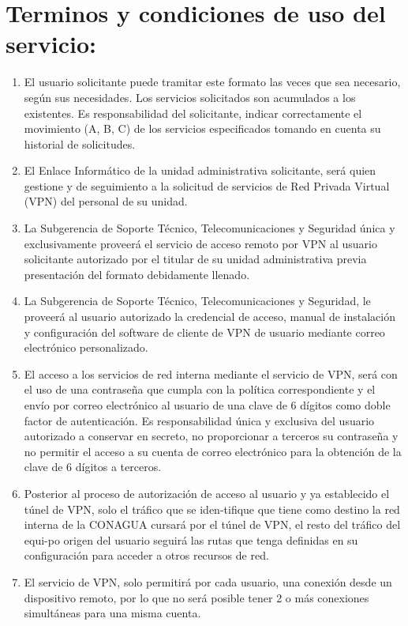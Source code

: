 \documentclass[letterpaper,11pt]{article}
\begin{document}
\section*{Terminos y condiciones de uso del servicio:}
{\footnotesize \begin{enumerate}
	\item El usuario solicitante puede tramitar este formato las veces que sea necesario, según sus necesidades. Los servicios solicitados son acumulados a los existentes. Es responsabilidad del solicitante, indicar correctamente el movimiento (A, B, C) de los servicios especificados tomando en cuenta su historial de solicitudes.
	\item El Enlace Informático de la unidad administrativa solicitante, será quien gestione y de seguimiento a la solicitud de servicios de Red Privada Virtual (VPN) del personal de su unidad. 
	\item La Subgerencia de Soporte Técnico, Telecomunicaciones y Seguridad única y exclusivamente proveerá el servicio de acceso remoto por VPN al usuario solicitante autorizado por el titular de su unidad administrativa previa presentación del formato debidamente llenado.
	\item La Subgerencia de Soporte Técnico, Telecomunicaciones y Seguridad, le proveerá al usuario autorizado la credencial de acceso, manual de instalación y configuración del software de cliente de VPN de usuario mediante correo electrónico personalizado.
	\item El acceso a los servicios de red interna mediante el servicio de VPN, será con el uso de una contraseña que cumpla con la política correspondiente y el envío por correo electrónico al usuario de una clave de 6 dígitos como doble factor de autenticación. Es responsabilidad única y exclusiva del usuario autorizado a conservar en secreto, no proporcionar a terceros su contraseña y no permitir el acceso a su cuenta de correo electrónico para la obtención de la clave de 6 dígitos a terceros.
	\item Posterior al proceso de autorización de acceso al usuario y ya establecido el túnel de VPN, solo el tráfico que se iden-tifique que tiene como destino la red interna de la CONAGUA cursará por el túnel de VPN, el resto del tráfico del equi-po origen del usuario seguirá las rutas que tenga definidas en su configuración para acceder a otros recursos de red.
	\item El servicio de VPN, solo permitirá por cada usuario, una conexión desde un dispositivo remoto, por lo que no será posible tener 2 o más conexiones simultáneas para una misma cuenta.

\end{enumerate}}
\end{document}
